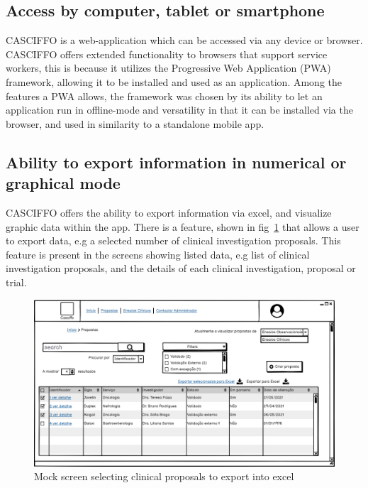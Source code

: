 \subsection{Access by computer, tablet or smartphone}
\label{subsec:access-by-mobile-device}
CASCIFFO is a web-application which can be accessed via any device or browser. CASCIFFO offers extended functionality to browsers that support service workers, this is because it utilizes the Progressive Web Application (PWA) framework, allowing it to be installed and used as an application.
Among the features a PWA allows, the framework was chosen by its ability to let an application run in offline-mode and versatility in that it can be installed via the browser, and used in similarity to a standalone mobile app. 

\subsection{Ability to export information in numerical or graphical mode}
\label{subsec:ability-to-export-info}
CASCIFFO offers the ability to export information via excel, and visualize graphic data within the app.  
There is a feature, shown in fig~\ref{fig:proposta-export-excel} that allows a user to export data, e.g a selected number of clinical investigation proposals. This feature is present in the screens showing listed data, e.g list of clinical investigation proposals, and the details of each clinical investigation, proposal or trial.

\begin{figure}[H]
    \centering
    \includegraphics[scale=0.35]{images/propostas-exportar-para-excel.png}
    \caption{Mock screen selecting clinical proposals to export into excel}
    \label{fig:proposta-export-excel}
\end{figure}

